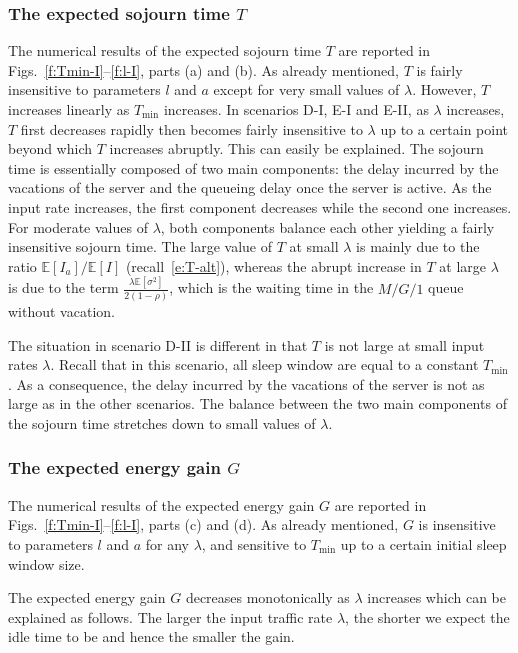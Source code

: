 \documentclass[journal]{IEEEtran}
\def \E{{\mathbb E}}
\begin{document}
\subsubsection{The expected sojourn time $T$}
\label{s:T}
The numerical results of the expected sojourn time $T$ are reported in Figs.~\ref{f:Tmin-I}--\ref{f:l-I}, parts (a) and (b). As already mentioned, $T$ is fairly insensitive to parameters $l$ and $a$ except
for very small values of $\lambda$. However, $T$ increases linearly as $T_{\min}$ increases. In scenarios D-I, E-I and E-II, as $\lambda$ increases, $T$ first decreases rapidly then becomes fairly insensitive to $\lambda$ up to a certain point beyond which $T$ increases abruptly. This can easily be explained. The sojourn time is essentially composed of two main components: the delay incurred by the vacations of the server and the queueing delay once the server is active. As the input rate increases, the first component decreases while the second one increases. For moderate values of $\lambda$, both components balance each other yielding a fairly insensitive sojourn time. The large value of $T$ at small $\lambda$ is mainly due to the ratio $\E[I_a]/\E[I]$ (recall~\eqref{e:T-alt}), whereas the abrupt increase in $T$ at large $\lambda$ is due to the term $\frac{\lambda\E[\sigma^2]}{2(1-\rho)}$, which is the waiting time in the $M/G/1$ queue without vacation.

The situation in scenario D-II is different in that $T$ is not large at small input rates $\lambda$. Recall that in this scenario, all sleep window are equal to a constant $T_{\min}$. As a consequence, the delay incurred by the vacations of the server is not as large as in the other scenarios. The balance between the two main components of the sojourn time stretches down to small values of $\lambda$.
\subsubsection{The expected energy gain $G$}
\label{s:G}
The numerical results of the expected energy gain $G$ are reported in Figs.~\ref{f:Tmin-I}--\ref{f:l-I}, parts (c) and (d). As already mentioned, $G$ is insensitive to parameters $l$ and $a$ for any $\lambda$, and sensitive to $T_{\min}$ up to a certain initial sleep window size. 

The expected energy gain $G$ decreases monotonically as $\lambda$ increases which can be explained as follows. The larger the input traffic rate $\lambda$, the shorter we expect the idle time to be and hence the smaller the gain.
\end{document}
